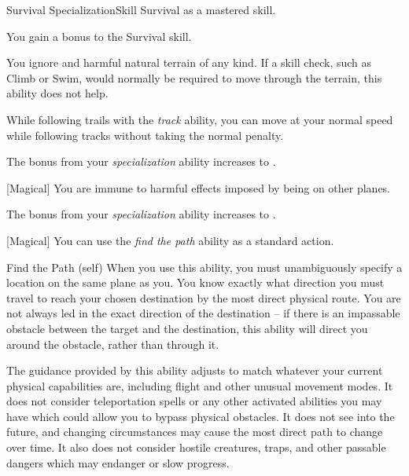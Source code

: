    \begin{feat}{Survival Specialization}{Skill}
        \featpre Survival as a mastered skill.

         You gain a  bonus to the Survival skill.

         You ignore  and harmful natural terrain of any kind.
        If a skill check, such as Climb or Swim, would normally be required to move through the terrain, this ability does not help.

        While following trails with the \textit{track} ability, you can move at your normal speed while following tracks without taking the normal  penalty.

         The bonus from your \textit{specialization} ability increases to .

        [Magical] You are immune to harmful effects imposed by being on other planes.

         The bonus from your \textit{specialization} ability increases to .

        [Magical] You can use the \textit{find the path} ability as a standard action.
        \begin{attuneability}{Find the Path}
             (self)
            \rankline
            When you use this ability, you must unambiguously specify a location on the same plane as you.
            You know exactly what direction you must travel to reach your chosen destination by the most direct physical route.
            You are not always led in the exact direction of the destination -- if there is an impassable obstacle between the target and the destination, this ability will direct you around the obstacle, rather than through it.

            The guidance provided by this ability adjusts to match whatever your current physical capabilities are, including flight and other unusual movement modes.
            It does not consider teleportation spells or any other activated abilities you may have which could allow you to bypass physical obstacles.
            It does not see into the future, and changing circumstances may cause the most direct path to change over time.
            It also does not consider hostile creatures, traps, and other passable dangers which may endanger or slow progress.
        \end{attuneability}
    \end{feat}

